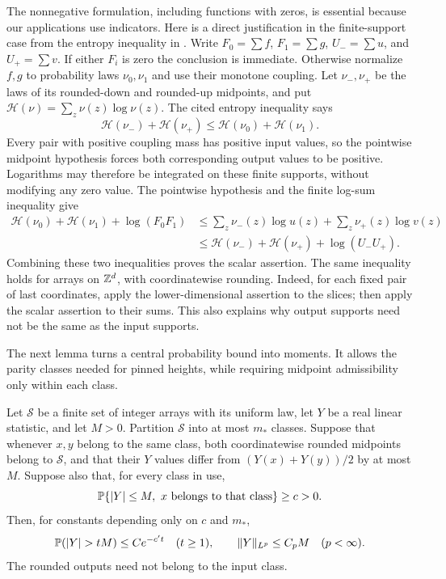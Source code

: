The nonnegative formulation, including functions with zeros, is essential
because our applications use indicators.  Here is a direct justification
in the finite-support case from the entropy inequality in
\cite[Theorem~8, equation~(9)]{GRST2019}.  Write $F_0=\sum f$,
$F_1=\sum g$, $U_-=\sum u$, and $U_+=\sum v$.  If either $F_i$ is zero
the conclusion is immediate.  Otherwise normalize $f,g$ to probability
laws $\nu_0,\nu_1$ and use their monotone coupling.  Let $\nu_-,\nu_+$
be the laws of its rounded-down and rounded-up midpoints, and put
$\mathcal H(\nu)=\sum_z\nu(z)\log\nu(z)$.  The cited entropy inequality
says
\[
 \mathcal H(\nu_-)+\mathcal H(\nu_+)
 \le \mathcal H(\nu_0)+\mathcal H(\nu_1).
\]
Every pair with positive coupling mass has positive input values, so the
pointwise midpoint hypothesis forces both corresponding output values to
be positive.  Logarithms may therefore be integrated on these finite
supports, without modifying any zero value.  The pointwise hypothesis and
the finite log-sum inequality give
\begin{align*}
 \mathcal H(\nu_0)+\mathcal H(\nu_1)+\log(F_0F_1)
 &\le \sum_z\nu_-(z)\log u(z)+\sum_z\nu_+(z)\log v(z)\\
 &\le \mathcal H(\nu_-)+\mathcal H(\nu_+)+\log(U_-U_+).
\end{align*}
Combining these two inequalities proves the scalar assertion.  The same
inequality holds for arrays on $\mathbb Z^d$, with coordinatewise rounding.
Indeed, for each fixed pair of last coordinates,
apply the lower-dimensional assertion to the slices; then apply the scalar
assertion to their sums.  This also explains why output supports need not
be the same as the input supports.

The next lemma turns a central probability bound into moments.  It allows
the parity classes needed for pinned heights, while requiring midpoint
admissibility only within each class.

\begin{lemma}\label{lem:midpoint-tails}
Let $\mathcal S$ be a finite set of integer arrays with its uniform law,
let $Y$ be a real linear statistic, and let $M>0$.  Partition $\mathcal S$ into at
most $m_*$ classes.  Suppose that whenever $x,y$ belong to the same class,
both coordinatewise rounded midpoints belong to $\mathcal S$, and that
their $Y$ values differ from $(Y(x)+Y(y))/2$ by at most $M$.  Suppose also
that, for every class in use,
\begin{equation}\label{eq:class-central-mass}
 \mathbb P\{\lvert Y\rvert\leq M,\ x\hbox{ belongs to that class}\}\geq c>0.
\end{equation}
Then, for constants depending only on $c$ and $m_*$,
\[
 \mathbb P(\lvert Y\rvert>tM)\leq C e^{-c't}\quad(t\geq1),\qquad
 \lVert Y\rVert_{L^p}\leq C_pM\quad(p<\infty).
\]
The rounded outputs need not belong to the input class.
\end{lemma}

